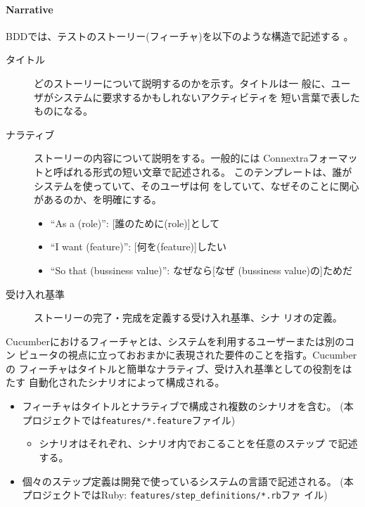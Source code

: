     \paragraph{Narrative}
BDDでは、テストのストーリー(フィーチャ)を以下のような構造で記述する
\cite{rspec-book,spiral-workflow}。
\begin{description}
 \item[タイトル] どのストーリーについて説明するのかを示す。タイトルは一
            般に、ユーザがシステムに要求するかもしれないアクティビティを
            短い言葉で表したものになる。
 \item[ナラティブ] ストーリーの内容について説明をする。一般的には
            Connextraフォーマットと呼ばれる形式の短い文章で記述される。
            このテンプレートは、誰がシステムを使っていて、そのユーザは何
            をしていて、なぜそのことに関心があるのか、を明確にする。
            \begin{itemize}
             \item ``As a (role)'': [誰のために(role)]として
             \item ``I want (feature)'': [何を(feature)]したい
             \item ``So that (bussiness value)'': なぜなら[なぜ
                   (bussiness value)の]ためだ
            \end{itemize}
 \item[受け入れ基準] ストーリーの完了・完成を定義する受け入れ基準、シナ
            リオの定義。
\end{description}

Cucumberにおけるフィーチャとは、システムを利用するユーザーまたは別のコン
ピュータの視点に立っておおまかに表現された要件のことを指す。Cucumberの
フィーチャはタイトルと簡単なナラティブ、受け入れ基準としての役割をはたす
自動化されたシナリオによって構成される。
\begin{itemize}
 \item フィーチャはタイトルとナラティブで構成され複数のシナリオを含む。
       (本プロジェクトでは\verb|features/*.feature|ファイル)
       \begin{itemize}
        \item シナリオはそれぞれ、シナリオ内でおこることを任意のステップ
              で記述する。
       \end{itemize}
 \item 個々のステップ定義は開発で使っているシステムの言語で記述される。
       (本プロジェクトではRuby: \verb|features/step_definitions/*.rb|ファ
       イル)
\end{itemize}

